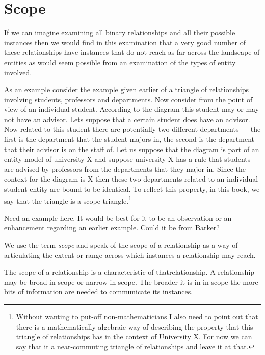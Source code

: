 
\section{Scope}
\label{Scope}
\mynote
If we can imagine examining all binary relationships and all their possible instances then we would find in this examination that a very  good number of  these relationships have instances that  do not reach as far across the landscape of entities as would seem possible from an examination of the types of entity involved.

\mynote As an example consider the example given earlier of a triangle of relationships involving students, professors and departments. 
Now consider from the point of view of an individual student. 
According to the diagram this student may or may not have an advisor. Lets suppose that a certain student does have an advisor. Now related to this student there are potentially two different departments --- the first is the department that the student majors in, the second is the department that their advisor is on the staff of. Let us suppose that the diagram is part of an entity model of university X and suppose university X has a rule that students are advised by professors from the departments that they major in. Since the context for the diagram is  X then these two departments related to an individual student entity are bound to be identical. To reflect this property, in this book, we say that the triangle is a scope triangle.\footnote{Without wanting to put-off non-mathematicians I also need to point out that there is a mathematically algebraic way of describing the property that this triangle of relationships has in the context of University X. For now we can say that it a near-commuting triangle of relationships and leave it at that.}   


\begin{noteforfuture}Need an example here. It would be best for it to be an observation or an enhancement regarding an earlier example. Could it be from Barker?
\end{noteforfuture}

We use the term \textit{scope} and speak of the scope of a relationship as a way of articulating the  extent or range across which instances a relationship may reach.  

The scope of a relationship is a characteristic of thatrelationship. A relationship may be broad in scope or narrow in scope. The broader it is in in scope the more bits of information are needed to communicate its instances. 

